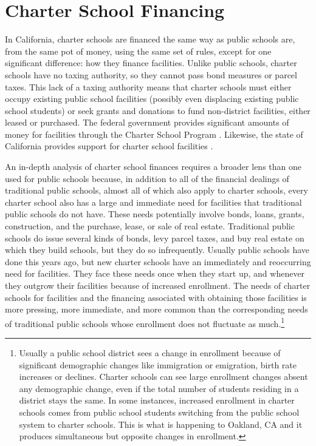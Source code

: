 \section{Charter School Financing}\label{sec:charter-school-financing}\indent%

In California, charter schools are financed the same way as public schools are, from the same pot of money, using the same set of rules, except for one significant difference: how they finance facilities. Unlike public schools, charter schools have no taxing authority, so they cannot pass bond measures or parcel taxes. This lack of a taxing authority means that charter schools must either occupy existing public school facilities (possibly even displacing existing public school students) or seek grants and donations to fund non-district facilities, either leased or purchased. The federal government provides significant amounts of money for facilities through the Charter School Program \parencite[0–10]{NCSRC2020}. Likewise, the state of California provides support for charter school facilities \parencite[114]{Aguinaldo.etal2023}.

An in-depth analysis of charter school finances requires a broader lens than one used for public schools because, in addition to all of the financial dealings of traditional public schools, almost all of which also apply to charter schools, every charter school also has a large and immediate need for facilities that traditional public schools do not have. These needs potentially involve  bonds, loans, grants, construction, and the purchase, lease, or sale of real estate. Traditional public schools do issue several kinds of bonds, levy parcel taxes, and buy real estate on which they build schools, but they do so infrequently. Usually public schools have done this years ago, but new charter schools have an immediately and reoccurring need for facilities. They face these needs once when they start up, and whenever they outgrow their facilities because of increased enrollment. The needs of charter schools for facilities and the financing associated with obtaining those facilities is more pressing, more immediate, and more common than the corresponding needs of traditional public schools whose enrollment does not fluctuate as much.\footnote{Usually a public school district sees a change in enrollment because of significant demographic changes like immigration or emigration, birth rate increases or declines. Charter schools can see large enrollment changes absent any demographic change, even if the total number of students residing in a district stays the same. In some instances, increased enrollment in charter schools comes from public school students switching from the public school system to charter schools. This is what is happening to Oakland, CA and it produces simultaneous but opposite changes in enrollment.}

